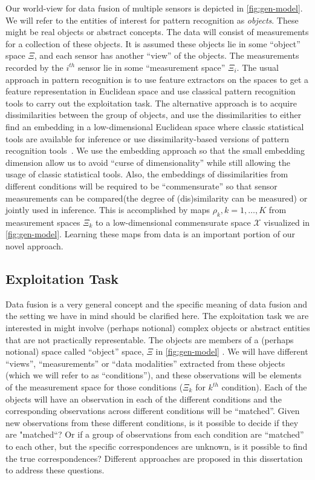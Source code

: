 \documentclass[12pt,oneside,final]{thesis}\usepackage[]{graphicx}\usepackage[]{color}
\begin{document}
 Our world-view for data fusion of multiple sensors is depicted in \autoref{fig:gen-model}. We will refer to the entities of interest for pattern recognition as \emph{objects}. These might be real objects or abstract concepts. The data will consist  of measurements for a collection of these objects.
 It is assumed these objects lie in some ``object'' space $\Xi$, and each sensor has another ``view'' of the objects. The measurements recorded by the $i^{th}$ sensor lie in some ``measurement space'' $\Xi_i$. The usual approach in pattern recognition is to use feature extractors on the spaces to get a feature representation in Euclidean space and use classical pattern recognition tools to carry out the exploitation task. The alternative approach is to acquire dissimilarities between the group of objects, and use the dissimilarities to either find an embedding in a low-dimensional Euclidean space where classic statistical tools are available for inference or use dissimilarity-based versions of pattern recognition tools~\cite{duin2005dissimilarity}. We use the embedding approach  so that  the small  embedding dimension allow us to avoid ``curse of dimensionality'' while still allowing the usage of classic statistical tools. Also, the embeddings of dissimilarities from  different conditions will be required to be ``commensurate'' so that sensor measurements can be compared(\ie the degree of (dis)similarity can be measured) or jointly used in inference. This is accomplished by maps $\rho_k,k=1,\ldots,K$ from measurement spaces $\Xi_k$ to a low-dimensional commensurate space $\mathcal{X}$ visualized in \autoref{fig:gen-model}. Learning these maps from data is  an important portion of our novel  approach.
\label{sec:data}

\subsection{Exploitation Task\label{subsec:expl_task}}
Data fusion is a very general concept and the specific meaning of data fusion and the setting we have in mind should be clarified here. The exploitation task we are interested in might involve (perhaps notional) complex objects or abstract entities that are not practically representable. The objects are members of a (perhaps notional) space called ``object'' space, $\Xi$ in \autoref{fig:gen-model} . We will have different ``views'', ``measurements'' or ``data modalities'' extracted from these objects (which we will refer to as ``conditions''), and these observations will be elements of the measurement space for those conditions ($\Xi_k$ for $k^{th}$ condition). Each  of the objects will have an observation in each of the different conditions and the corresponding observations across different conditions will be ``matched''. Given new observations from these different conditions, is it possible to decide if they are "matched``? Or if a group of  observations from each condition are ``matched'' to each other, but the specific correspondences are unknown, is it possible to find the true correspondences? Different approaches are proposed in this dissertation to address these questions.
\label{subsec:task}
\end{document}

